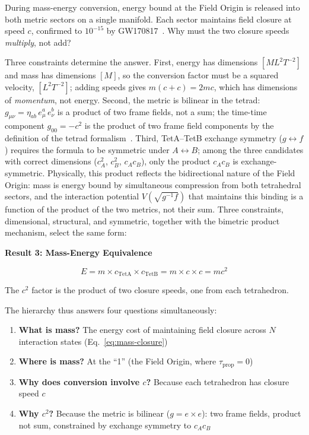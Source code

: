\documentclass[aps,prd,preprint,superscriptaddress,showpacs,preprintnumbers,amsmath,amssymb,nofootinbib]{revtex4-2}
\begin{document}
During mass-energy conversion, energy bound at the Field Origin is released into both metric sectors on a single manifold. Each sector maintains field closure at speed $c$, confirmed to $10^{-15}$ by GW170817~\cite{gw170817}. Why must the two closure speeds \emph{multiply}, not add?

Three constraints determine the answer. First, energy has dimensions $[ML^2T^{-2}]$ and mass has dimensions $[M]$, so the conversion factor must be a squared velocity, $[L^2T^{-2}]$; adding speeds gives $m(c + c) = 2mc$, which has dimensions of \emph{momentum}, not energy. Second, the metric is bilinear in the tetrad: $g_{\mu\nu} = \eta_{ab}\,e^a_\mu\,e^b_\nu$ is a product of two frame fields, not a sum; the time-time component $g_{00} = -c^2$ is the product of two frame field components by the definition of the tetrad formalism~\cite{mtw1973}. Third, TetA--TetB exchange symmetry ($g \leftrightarrow f$) requires the formula to be symmetric under $A \leftrightarrow B$; among the three candidates with correct dimensions ($c_A^2$, $c_B^2$, $c_A c_B$), only the product $c_A c_B$ is exchange-symmetric. Physically, this product reflects the bidirectional nature of the Field Origin: mass is energy bound by simultaneous compression from both tetrahedral sectors, and the interaction potential $V(\sqrt{g^{-1}f})$ that maintains this binding is a function of the product of the two metrics, not their sum. Three constraints, dimensional, structural, and symmetric, together with the bimetric product mechanism, select the same form:

\vspace{1.5em}
\noindent
\colorbox{resultgreen}{\parbox{\dimexpr\textwidth-2\fboxsep\relax}{%
\vspace{0.8em}
\centering
\textbf{\large Result 3: Mass-Energy Equivalence}

\vspace{0.5em}
\boldmath
\begin{equation}
E = m \times c_{\text{TetA}} \times c_{\text{TetB}} = m \times c \times c = mc^2
\end{equation}
\unboldmath

\vspace{0.3em}
The $c^2$ factor is the product of two closure speeds, one from each tetrahedron.
\vspace{0.5em}
}}
\vspace{1cm}

The hierarchy thus answers four questions simultaneously:
\begin{enumerate}
\item \textbf{What is mass?} The energy cost of maintaining field closure across $N$ interaction states (Eq.~\ref{eq:mass-closure})
\item \textbf{Where is mass?} At the ``1'' (the Field Origin, where $\tau_{\text{prop}} = 0$)
\item \textbf{Why does conversion involve $c$?} Because each tetrahedron has closure speed $c$
\item \textbf{Why $c^2$?} Because the metric is bilinear ($g = e \times e$): two frame fields, product not sum, constrained by exchange symmetry to $c_A c_B$
\end{enumerate}
\end{document}
